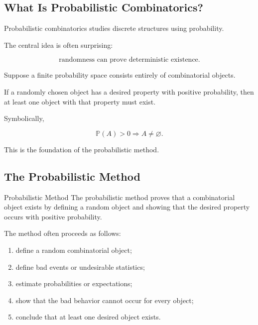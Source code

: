 \subsection{What Is Probabilistic Combinatorics?}
\label{subsec:what-is-probabilistic-combinatorics}

Probabilistic combinatorics studies discrete structures using
probability.

The central idea is often surprising:

\[
\boxed{
\text{randomness can prove deterministic existence}.
}
\]

Suppose a finite probability space consists entirely of combinatorial
objects.

If a randomly chosen object has a desired property with positive
probability, then at least one object with that property must exist.

Symbolically,

\[
\boxed{
\mathbb{P}(A)>0
\Longrightarrow
A\neq\varnothing.
}
\]

This is the foundation of the probabilistic method.

\subsection{The Probabilistic Method}
\label{subsec:probabilistic-method}

\begin{definitionbox}{Probabilistic Method}
The probabilistic method proves that a combinatorial object exists by
defining a random object and showing that the desired property occurs
with positive probability.
\end{definitionbox}

The method often proceeds as follows:

\begin{enumerate}
    \item define a random combinatorial object;
    \item define bad events or undesirable statistics;
    \item estimate probabilities or expectations;
    \item show that the bad behavior cannot occur for every object;
    \item conclude that at least one desired object exists.
\end{enumerate}

